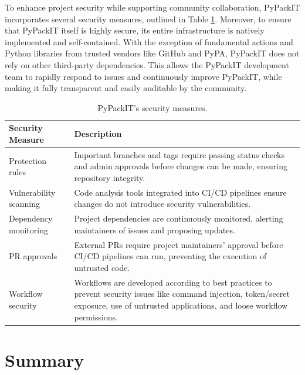 \documentclass{article}
\begin{document}
To enhance project security while supporting community collaboration, PyPackIT incorporates several security measures, outlined in Table \ref{tab:security-measures}. Moreover, to ensure that PyPackIT itself is highly secure, its entire infrastructure is natively implemented and self-contained. With the exception of fundamental actions and Python libraries from trusted vendors like GitHub and PyPA, PyPackIT does not rely on other third-party dependencies. This allows the PyPackIT development team to rapidly respond to issues and continuously improve PyPackIT, while making it fully transparent and easily auditable by the community.
\begin{table}[h!]
    \centering
    \caption{PyPackIT's security measures.}
    \label{tab:security-measures}
    \begin{tabularx}{\textwidth}{>{\raggedright\arraybackslash}p{3cm} X}
        \toprule
        \rowcolor{white} \textbf{Security Measure} & \textbf{Description} \\
        \midrule
        
        Protection rules& Important branches and tags require passing status checks and admin approvals before changes can be made, ensuring repository integrity. \\

        Vulnerability scanning& Code analysis tools integrated into CI/CD pipelines ensure changes do not introduce security vulnerabilities. \\

        Dependency monitoring& Project dependencies are continuously monitored, alerting maintainers of issues and proposing updates. \\
      
        PR approvals& External PRs require project maintainers' approval before CI/CD pipelines can run, preventing the execution of untrusted code. \\
   
        Workflow security& Workflows are developed according to best practices \cite{AutoSecurityAssessOfGHAWorkflows, GHADocsSecurity} to prevent security issues like command injection, token/secret exposure, use of untrusted applications, and loose workflow permissions. \\
        
        \bottomrule
    \end{tabularx}
\end{table}

\section{Summary}
\label{section-summary}
\end{document}
